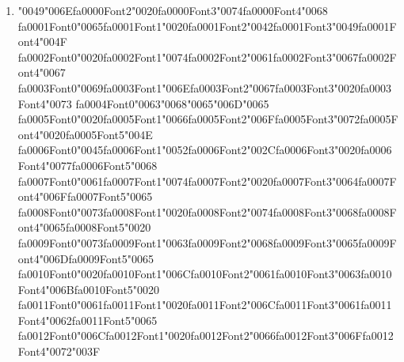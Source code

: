 \documentclass[11pt]{article}
\begin{document}
\begin{enumerate}[label=Q\arabic*., leftmargin=*]
\item {\char"0049}{\char"006E}{\csname fa0000Font2\endcsname\char"0020}{\csname fa0000Font3\endcsname\char"0074}{\csname fa0000Font4\endcsname\char"0068} {\csname fa0001Font0\endcsname\char"0065}{\csname fa0001Font1\endcsname\char"0020}{\csname fa0001Font2\endcsname\char"0042}{\csname fa0001Font3\endcsname\char"0049}{\csname fa0001Font4\endcsname\char"004F} {\csname fa0002Font0\endcsname\char"0020}{\csname fa0002Font1\endcsname\char"0074}{\csname fa0002Font2\endcsname\char"0061}{\csname fa0002Font3\endcsname\char"0067}{\csname fa0002Font4\endcsname\char"0067} {\csname fa0003Font0\endcsname\char"0069}{\csname fa0003Font1\endcsname\char"006E}{\csname fa0003Font2\endcsname\char"0067}{\csname fa0003Font3\endcsname\char"0020}{\csname fa0003Font4\endcsname\char"0073} {\csname fa0004Font0\endcsname\char"0063}{\char"0068}{\char"0065}{\char"006D}{\char"0065} {\csname fa0005Font0\endcsname\char"0020}{\csname fa0005Font1\endcsname\char"0066}{\csname fa0005Font2\endcsname\char"006F}{\csname fa0005Font3\endcsname\char"0072}{\csname fa0005Font4\endcsname\char"0020}{\csname fa0005Font5\endcsname\char"004E} {\csname fa0006Font0\endcsname\char"0045}{\csname fa0006Font1\endcsname\char"0052}{\csname fa0006Font2\endcsname\char"002C}{\csname fa0006Font3\endcsname\char"0020}{\csname fa0006Font4\endcsname\char"0077}{\csname fa0006Font5\endcsname\char"0068} {\csname fa0007Font0\endcsname\char"0061}{\csname fa0007Font1\endcsname\char"0074}{\csname fa0007Font2\endcsname\char"0020}{\csname fa0007Font3\endcsname\char"0064}{\csname fa0007Font4\endcsname\char"006F}{\csname fa0007Font5\endcsname\char"0065} {\csname fa0008Font0\endcsname\char"0073}{\csname fa0008Font1\endcsname\char"0020}{\csname fa0008Font2\endcsname\char"0074}{\csname fa0008Font3\endcsname\char"0068}{\csname fa0008Font4\endcsname\char"0065}{\csname fa0008Font5\endcsname\char"0020} {\csname fa0009Font0\endcsname\char"0073}{\csname fa0009Font1\endcsname\char"0063}{\csname fa0009Font2\endcsname\char"0068}{\csname fa0009Font3\endcsname\char"0065}{\csname fa0009Font4\endcsname\char"006D}{\csname fa0009Font5\endcsname\char"0065} {\csname fa0010Font0\endcsname\char"0020}{\csname fa0010Font1\endcsname\char"006C}{\csname fa0010Font2\endcsname\char"0061}{\csname fa0010Font3\endcsname\char"0063}{\csname fa0010Font4\endcsname\char"006B}{\csname fa0010Font5\endcsname\char"0020} {\csname fa0011Font0\endcsname\char"0061}{\csname fa0011Font1\endcsname\char"0020}{\csname fa0011Font2\endcsname\char"006C}{\csname fa0011Font3\endcsname\char"0061}{\csname fa0011Font4\endcsname\char"0062}{\csname fa0011Font5\endcsname\char"0065} {\csname fa0012Font0\endcsname\char"006C}{\csname fa0012Font1\endcsname\char"0020}{\csname fa0012Font2\endcsname\char"0066}{\csname fa0012Font3\endcsname\char"006F}{\csname fa0012Font4\endcsname\char"0072}{\char"003F}


\end{enumerate}
\end{document}
